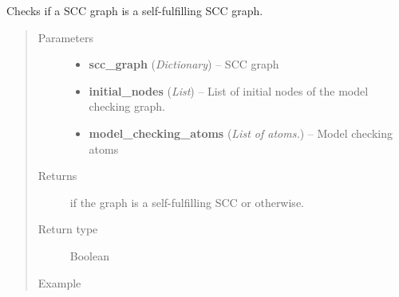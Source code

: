 \documentclass[letterpaper,10pt,english]{sphinxmanual}
\begin{document}
\begin{fulllineitems}
\label{searchingAlgorithm:searchingAlgorithm.isSelfFulfilling}
Checks if a SCC graph is a self-fulfilling SCC graph.
\begin{quote}\begin{description}
\item[{Parameters}] \leavevmode\begin{itemize}
\item {} 
\textbf{scc\_graph} (\emph{Dictionary}) -- SCC graph

\item {} 
\textbf{initial\_nodes} (\emph{List}) -- List of initial nodes of the model checking graph.

\item {} 
\textbf{model\_checking\_atoms} (\emph{List of atoms.}) -- Model checking atoms

\end{itemize}

\item[{Returns}] \leavevmode
{} if the graph is a self-fulfilling SCC or  otherwise.

\item[{Return type}] \leavevmode
Boolean

\item[{Example }] \leavevmode
\end{description}\end{quote}


\end{fulllineitems}
\end{document}
